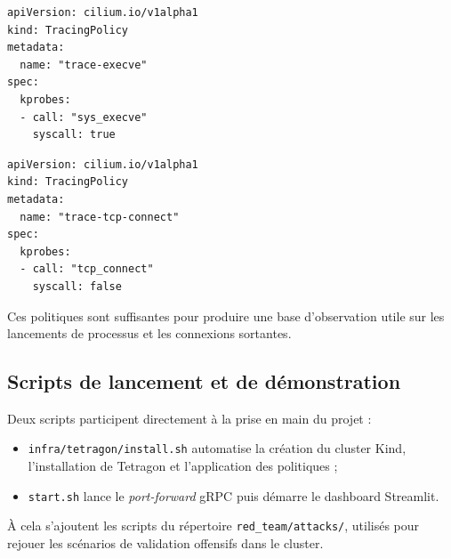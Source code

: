 \documentclass[a4paper,12pt]{article}
\begin{document}
\begin{lstlisting}[style=annexecode]
apiVersion: cilium.io/v1alpha1
kind: TracingPolicy
metadata:
  name: "trace-execve"
spec:
  kprobes:
  - call: "sys_execve"
    syscall: true
\end{lstlisting}

\begin{lstlisting}[style=annexecode]
apiVersion: cilium.io/v1alpha1
kind: TracingPolicy
metadata:
  name: "trace-tcp-connect"
spec:
  kprobes:
  - call: "tcp_connect"
    syscall: false
\end{lstlisting}

Ces politiques sont suffisantes pour produire une base d'observation utile sur les lancements de processus et les connexions sortantes.

\subsection{Scripts de lancement et de démonstration}

Deux scripts participent directement à la prise en main du projet :
\begin{itemize}
    \item \texttt{infra/tetragon/install.sh} automatise la création du cluster Kind, l'installation de Tetragon et l'application des politiques ;
    \item \texttt{start.sh} lance le \textit{port-forward} gRPC puis démarre le dashboard Streamlit.
\end{itemize}

À cela s'ajoutent les scripts du répertoire \texttt{red\_team/attacks/}, utilisés pour rejouer les scénarios de validation offensifs dans le cluster.
\end{document}
